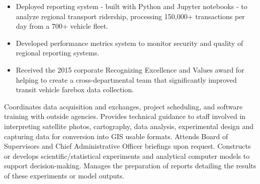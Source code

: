 \documentclass[letterpaper]{article}
\newcommand{\employer}[4]{
        \vspace{3pt}
        \textbf{#1}  %
        \hfill #2\\  %
        \textit{#3}  %
        \hfill #4\\  %
        \vspace{1mm}
    }
\newenvironment{jobtasklist}
        {
            \vspace{-12pt}
            \begin{itemize} \itemsep 0pt
        }{
            \end{itemize}
            \vspace{-3pt}
        }
\begin{document}
\begin{jobtasklist}
    \item Deployed reporting system - built with Python and Jupyter notebooks -
        to analyze regional transport ridership, processing 150,000+
        transactions per day from a 700+ vehicle fleet.

    \item Developed performance metrics system to monitor security and quality
        of regional reporting systems.

    \item Received the 2015 corporate Recognizing Excellence and Values award
        for helping to create a cross-departmental team that significantly
        improved transit vehicle farebox data collection.

\end{jobtasklist}

Coordinates data acquisition and exchanges, project scheduling, and software training with outside agencies.
Provides technical guidance to staff involved in interpreting satellite photos,
cartography, data analysis, experimental design and capturing data for
conversion into GIS usable formats.  
Attends Board of Supervisors and Chief Administrative Officer briefings upon request.
Constructs or develops scientific/statistical experiments and analytical computer models to support decision-making.
Manages the preparation of reports detailing the results of these experiments or model outputs.

%
%
%
\end{document}
